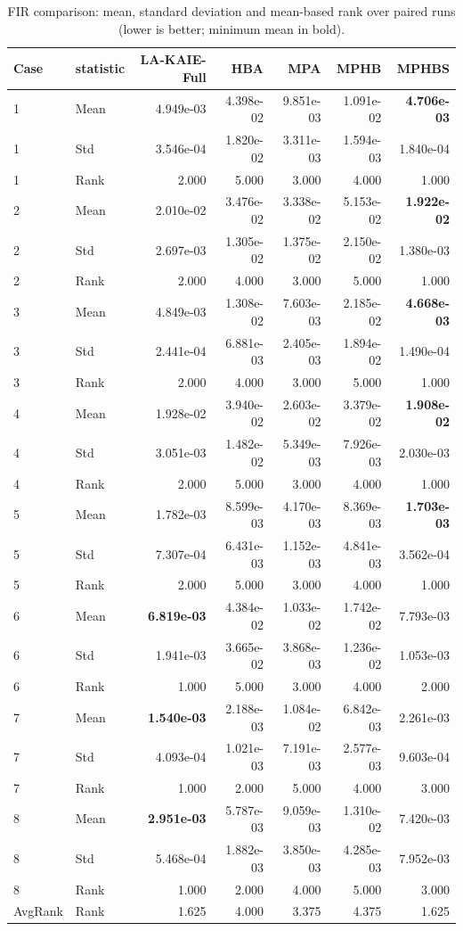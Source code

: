 \begin{table}[t]
\centering
\scriptsize
\caption{FIR comparison: mean, standard deviation and mean-based rank over paired runs (lower is better; minimum mean in bold).}
\label{tab:fir_comparison}
\begin{tabular}{llrrrrr}
\hline
Case & statistic & LA-KAIE-Full & HBA & MPA & MPHB & MPHBS \\
\hline
1 & Mean & 4.949e-03 & 4.398e-02 & 9.851e-03 & 1.091e-02 & \textbf{4.706e-03} \\
1 & Std & 3.546e-04 & 1.820e-02 & 3.311e-03 & 1.594e-03 & 1.840e-04 \\
1 & Rank & 2.000 & 5.000 & 3.000 & 4.000 & 1.000 \\
2 & Mean & 2.010e-02 & 3.476e-02 & 3.338e-02 & 5.153e-02 & \textbf{1.922e-02} \\
2 & Std & 2.697e-03 & 1.305e-02 & 1.375e-02 & 2.150e-02 & 1.380e-03 \\
2 & Rank & 2.000 & 4.000 & 3.000 & 5.000 & 1.000 \\
3 & Mean & 4.849e-03 & 1.308e-02 & 7.603e-03 & 2.185e-02 & \textbf{4.668e-03} \\
3 & Std & 2.441e-04 & 6.881e-03 & 2.405e-03 & 1.894e-02 & 1.490e-04 \\
3 & Rank & 2.000 & 4.000 & 3.000 & 5.000 & 1.000 \\
4 & Mean & 1.928e-02 & 3.940e-02 & 2.603e-02 & 3.379e-02 & \textbf{1.908e-02} \\
4 & Std & 3.051e-03 & 1.482e-02 & 5.349e-03 & 7.926e-03 & 2.030e-03 \\
4 & Rank & 2.000 & 5.000 & 3.000 & 4.000 & 1.000 \\
5 & Mean & 1.782e-03 & 8.599e-03 & 4.170e-03 & 8.369e-03 & \textbf{1.703e-03} \\
5 & Std & 7.307e-04 & 6.431e-03 & 1.152e-03 & 4.841e-03 & 3.562e-04 \\
5 & Rank & 2.000 & 5.000 & 3.000 & 4.000 & 1.000 \\
6 & Mean & \textbf{6.819e-03} & 4.384e-02 & 1.033e-02 & 1.742e-02 & 7.793e-03 \\
6 & Std & 1.941e-03 & 3.665e-02 & 3.868e-03 & 1.236e-02 & 1.053e-03 \\
6 & Rank & 1.000 & 5.000 & 3.000 & 4.000 & 2.000 \\
7 & Mean & \textbf{1.540e-03} & 2.188e-03 & 1.084e-02 & 6.842e-03 & 2.261e-03 \\
7 & Std & 4.093e-04 & 1.021e-03 & 7.191e-03 & 2.577e-03 & 9.603e-04 \\
7 & Rank & 1.000 & 2.000 & 5.000 & 4.000 & 3.000 \\
8 & Mean & \textbf{2.951e-03} & 5.787e-03 & 9.059e-03 & 1.310e-02 & 7.420e-03 \\
8 & Std & 5.468e-04 & 1.882e-03 & 3.850e-03 & 4.285e-03 & 7.952e-03 \\
8 & Rank & 1.000 & 2.000 & 4.000 & 5.000 & 3.000 \\
AvgRank & Rank & 1.625 & 4.000 & 3.375 & 4.375 & 1.625 \\
\hline
\end{tabular}
\end{table}
